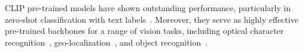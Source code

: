 CLIP pre-trained models have shown outstanding performance, particularly in zero-shot classification with text labels~\citep{}. Moreover, they serve as highly effective pre-trained backbones for a range of vision tasks, including optical character recognition~\citep{}, geo-localization~\citep{}, and object recognition~\citep{}.
